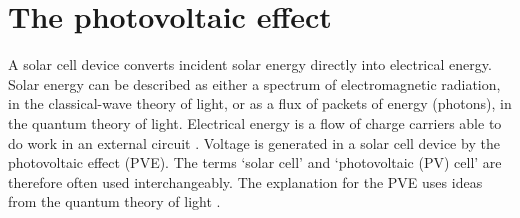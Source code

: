 \documentclass[11pt, twoside]{report}
\begin{document}



\section{The photovoltaic effect}
A solar cell device converts incident solar energy directly into electrical energy. Solar energy can be described as either a spectrum of electromagnetic radiation, in the classical-wave theory of light, or as a flux of packets of energy (photons), in the quantum theory of light. Electrical energy is a flow of charge carriers able to do work in an external circuit \cite{spatial_resolved_book}. Voltage is generated in a solar cell device by the photovoltaic effect (PVE). The terms `solar cell' and `photovoltaic (PV) cell' are therefore often used interchangeably. The explanation for the PVE uses ideas from the quantum theory of light \cite{Nelson1}.
\end{document}
